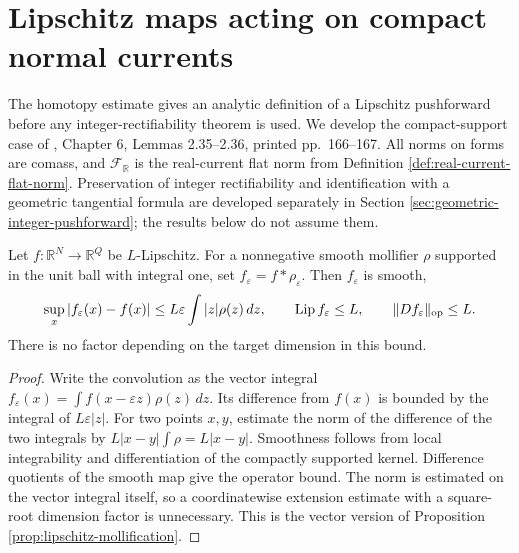 \chapter{Lipschitz maps acting on compact normal currents}\label{sec:normal-lipschitz-pushforward}
The homotopy estimate gives an analytic definition of a Lipschitz pushforward before any integer-rectifiability theorem is used. We develop the compact-support case of \cite{Sim18}, Chapter 6, Lemmas 2.35--2.36, printed pp.~166--167. All norms on forms are comass, and $\mathcal F_{\mathbb R}$ is the real-current flat norm from Definition \ref{def:real-current-flat-norm}. Preservation of integer rectifiability and identification with a geometric tangential formula are developed separately in Section \ref{sec:geometric-integer-pushforward}; the results below do not assume them.

\begin{lemma}\label{lem:vector-map-lipschitz-mollification}
Let $f:\mathbb R^N\to\mathbb R^Q$ be $L$-Lipschitz. For a nonnegative smooth mollifier $\rho$ supported in the unit ball with integral one, set $f_\varepsilon=f*\rho_\varepsilon$. Then $f_\varepsilon$ is smooth,
\[
 \sup_x|f_\varepsilon(x)-f(x)|
 \leq L\varepsilon\int|z|\rho(z)\,dz,
 \qquad \operatorname{Lip}f_\varepsilon\leq L,
 \qquad \|Df_\varepsilon\|_{\rm op}\leq L.
\]
There is no factor depending on the target dimension in this bound.
\end{lemma}
\begin{proof}
Write the convolution as the vector integral $f_\varepsilon(x)=\int f(x-\varepsilon z)\rho(z)\,dz$. Its difference from $f(x)$ is bounded by the integral of $L\varepsilon|z|$. For two points $x,y$, estimate the norm of the difference of the two integrals by $L|x-y|\int\rho=L|x-y|$. Smoothness follows from local integrability and differentiation of the compactly supported kernel. Difference quotients of the smooth map give the operator bound. The norm is estimated on the vector integral itself, so a coordinatewise extension estimate with a square-root dimension factor is unnecessary. This is the vector version of Proposition \ref{prop:lipschitz-mollification}.
\end{proof}

